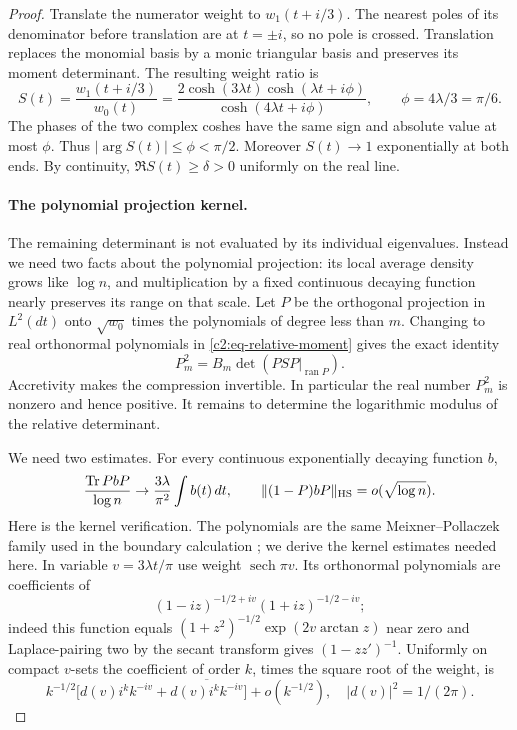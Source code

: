 \begin{proof}
Translate the numerator weight to \(w_1(t+i/3)\). The nearest poles
of its denominator before translation are at \(t=\pm i\), so no pole
is crossed. Translation replaces the monomial basis by a monic
triangular basis and preserves its moment determinant. The resulting
weight ratio is
\[
 S(t)=\frac{w_1(t+i/3)}{w_0(t)}
 =\frac{2\cosh(3\lambda t)\cosh(\lambda t+i\phi)}
        {\cosh(4\lambda t+i\phi)},\qquad \phi=4\lambda/3=\pi/6.
\]
The phases of the two complex coshes have the same sign and absolute
value at most \(\phi\). Thus \(|\arg S(t)|\le\phi<\pi/2\).
Moreover \(S(t)\to1\) exponentially at both ends. By continuity,
\(\Re S(t)\ge\delta>0\) uniformly on the real line.

\paragraph{The polynomial projection kernel.}
The remaining determinant is not evaluated by its individual eigenvalues.
Instead we need two facts about the polynomial projection: its local
average density grows like \(\log n\), and multiplication by a fixed
continuous decaying function nearly preserves its range on that scale.
Let \(P\) be the orthogonal projection in \(L^2(dt)\) onto
\(\sqrt{w_0}\) times the polynomials of degree less than \(m\).
Changing to real orthonormal polynomials in
\eqref{c2:eq-relative-moment} gives the exact identity
\[
 P_m^2=B_m\det(PSP|_{\operatorname{ran}P}).
\]
Accretivity makes the compression invertible. In particular the real
number \(P_m^2\) is nonzero and hence positive. It remains to determine
the logarithmic modulus of the relative determinant.

We need two estimates. For every continuous exponentially decaying
function \(b\),
\begin{equation}
 \frac{\operatorname{Tr}PbP}{\log n}\to\frac{3\lambda}{\pi^2}\int b(t)\,dt,
 \qquad \|(1-P)bP\|_{\rm HS}=o(\sqrt{\log n}).                           \label{c2:eq-V9}
\end{equation}
Here is the kernel verification. The polynomials are the same
Meixner--Pollaczek family used in the boundary calculation
\cite[18.23.7]{DLMF}; we derive the kernel estimates needed here.
In variable \(v=3\lambda t/\pi\) use weight \(\operatorname{sech}\pi v\). Its orthonormal polynomials are coefficients of
\[
 (1-iz)^{-1/2+iv}(1+iz)^{-1/2-iv};
\]
indeed this function equals \((1+z^2)^{-1/2}\exp(2v\arctan z)\) near zero and Laplace-pairing two by the secant transform gives \((1-zz')^{-1}\). Uniformly on compact \(v\)-sets the coefficient of order \(k\), times the square root of the weight, is
\[
 k^{-1/2}\big[d(v)i^k k^{-iv}+\overline{d(v)i^k k^{-iv}}\big]+o(k^{-1/2}),
 \quad |d(v)|^2=1/(2\pi).
\]



\end{proof}
